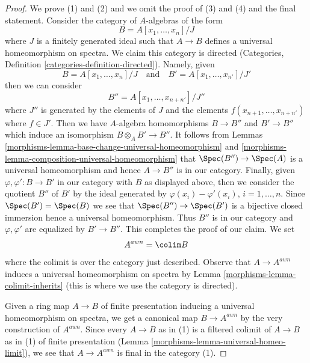 \begin{proof}

We prove (1) and (2) and we omit the proof of (3) and (4) and
the final statement. Consider the category of $A$-algebras of the form
$$
B = A[x_1, \ldots, x_n]/J
$$
where $J$ is a finitely generated ideal such that $A \to B$ defines a
universal homeomorphism on spectra. We claim this category is directed
(Categories, Definition \ref{categories-definition-directed}). Namely, given
$$
B = A[x_1, \ldots, x_n]/J
\quad\text{and}\quad
B' = A[x_1, \ldots, x_{n'}]/J'
$$
then we can consider
$$
B'' = A[x_1, \ldots, x_{n + n'}]/J''
$$
where $J''$ is generated by the elements of $J$ and the elements
$f(x_{n + 1}, \ldots, x_{n + n'})$ where $f \in J'$.
Then we have $A$-algebra homomorphisms $B \to B''$ and $B' \to B''$
which induce an isomorphism $B \otimes_A B' \to B''$.
It follows from
Lemmas \ref{morphisms-lemma-base-change-universal-homeomorphism} and
\ref{morphisms-lemma-composition-universal-homeomorphism}
that $\Spec(B'') \to \Spec(A)$ is a universal homeomorphism and
hence $A \to B''$ is in our category.
Finally, given $\varphi, \varphi' : B \to B'$
in our category with $B$ as displayed above,
then we consider the quotient $B''$ of $B'$
by the ideal generated by $\varphi(x_i) - \varphi'(x_i)$, $i = 1, \ldots, n$.
Since $\Spec(B') = \Spec(B)$ we see that $\Spec(B'') \to \Spec(B')$
is a bijective closed immersion hence a universal homeomorphism.
Thus $B''$ is in our category and $\varphi, \varphi'$ are equalized
by $B' \to B''$. This completes the proof of our claim. We set
$$
A^{awn} = \colim B
$$
where the colimit is over the category just described. Observe that
$A \to A^{awn}$ induces a universal homeomorphism on spectra by
Lemma \ref{morphisms-lemma-colimit-inherits} (this is where we use the category
is directed).

\medskip\noindent
Given a ring map $A \to B$ of finite presentation inducing a universal
homeomorphism on spectra, we get a canonical map $B \to A^{awn}$ by the
very construction of $A^{awn}$. Since every $A \to B$ as in (1)
is a filtered colimit of $A \to B$ as in (1) of finite presentation
(Lemma \ref{morphisms-lemma-universal-homeo-limit}), we see that
$A \to A^{awn}$ is final in the category (1).


\end{proof}

